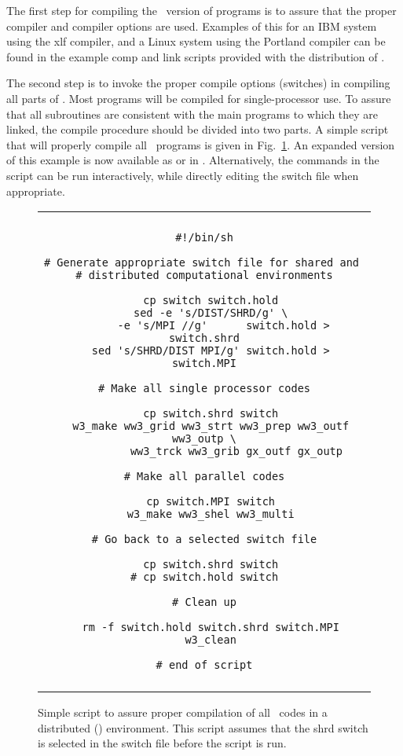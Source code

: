 The first step for compiling the \mpi\ version of programs is to assure that
the proper compiler and compiler options are used. Examples of this for an IBM
system using the xlf compiler, and a Linux system using the Portland compiler
can be found in the example {\file comp} and {\file link} scripts provided
with the distribution of \ws.

The second step is to invoke the proper compile options (switches) in
compiling all parts of \ws. Most programs will be compiled for
single-processor use. To assure that all subroutines are consistent with the
main programs to which they are linked, the compile procedure should be
divided into two parts.  A simple script that will properly compile all \ws\
programs is given in Fig.~\ref{fig:make_MPI}.  An expanded version of this
example is now available as \command{make\_MPI} or in . Alternatively, the commands
in the script can be run interactively, while directly editing the {\file
  switch} file when appropriate.

\begin{figure}
\begin{center} \begin{tabular}{|c|} \hline \\
\begin{minipage}{5in} 
\begin{verbatim}
#!/bin/sh

# Generate appropriate switch file for shared and 
# distributed computational environments

  cp switch switch.hold
  sed -e 's/DIST/SHRD/g' \
      -e 's/MPI //g'      switch.hold > switch.shrd
  sed 's/SHRD/DIST MPI/g' switch.hold > switch.MPI

# Make all single processor codes

  cp switch.shrd switch
  w3_make ww3_grid ww3_strt ww3_prep ww3_outf ww3_outp \
          ww3_trck ww3_grib gx_outf gx_outp

# Make all parallel codes

  cp switch.MPI switch
  w3_make ww3_shel ww3_multi

# Go back to a selected switch file

  cp switch.shrd switch
# cp switch.hold switch

# Clean up

  rm -f switch.hold switch.shrd switch.MPI
  w3_clean

# end of script
\end{verbatim}
\end{minipage} \\ \\ \hline
\end{tabular} \end{center}

\caption{Simple script to assure proper compilation of all \ws\ codes in a
   distributed (\mpi) environment. This script assumes that the {\F shrd}
   switch is selected in the {\file switch} file before the script is run.}
   \label{fig:make_MPI}
\end{figure}

